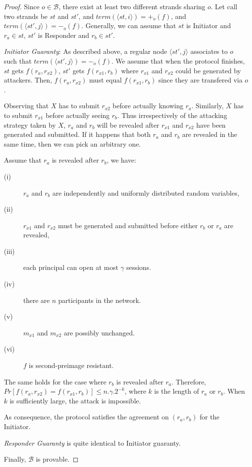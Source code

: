 \begin{proof}

Since $o \in \mathcal{B}$, there exist at least two different strands sharing $o$. Let call two strands be $st$ and $st'$, and $term(\langle st,i\rangle )=+_o(f)$, and $term(\langle st',j\rangle ) = -_o(f)$. Generally, we can assume that $st$ is Initiator and $r_a \in st$, $st'$ is Responder and $r_b \in st'$. 

\emph{Initiator Guaranty}: As described above, a regular node $\langle st',j\rangle $ associates to $o$ such that $term(\langle st',j\rangle ) = -_o(f)$. We assume that when the protocol finishes, $st$ gets $f(r_a,r_{x2})$, $st'$ gets $f(r_{x1},r_b)$ where $r_{x1}$ and $r_{x2}$ could be generated by attackers. Then, $f(r_a,r_{x2})$ must equal $f(r_{x1},r_b)$ since they are transfered via $o$. 

Observing that $X$ has to submit $r_{x2}$ before actually knowing $r_a$. Similarly, $X$ has to submit $r_{x1}$ before actually seeing $r_b$. Thus irrespectively of the attacking strategy taken by $X$, $r_a$ and $r_b$ will be revealed after $r_{x1}$ and $r_{x2}$ have been generated and submitted. If it happens that both $r_a$ and $r_b$ are revealed in the same time, then we can pick an arbitrary one. 

Assume that $r_a$ is revealed after $r_b$, we have:
\begin{description}
 \item [(i)] $r_a$ and $r_b$ are independently and uniformly distributed random variables, 
 \item [(ii)] $r_{x1}$ and $r_{x2}$ must be generated and submitted before either $r_b$ or $r_a$ are revealed, 
 \item [(iii)] each principal can open at most $\gamma$ sessions. 
 \item [(iv)] there are $n$ participants in the network. 
 \item [(v)] $m_{x1}$ and $m_{x2}$ are possibly unchanged.
 \item [(vi)] $f$ is second-preimage resistant. 
\end{description}
The same holds for the case where $r_b$ is revealed after $r_a$. Therefore, $Pr[f(r_a,r_{x2}) = f(r_{x1},r_b)] \leq n.\gamma.2^{-k}$, where $k$ is the length of $r_a$ or $r_b$. When $k$ is sufficiently large, the attack is impossible. 

As consequence, the protocol satisfies the agreement on $(r_a,r_b)$ for the Initiator. 

\emph{Responder Guaranty} is quite identical to Initiator guaranty. 

Finally, $\mathcal{B}$ is provable. 
\end{proof}

